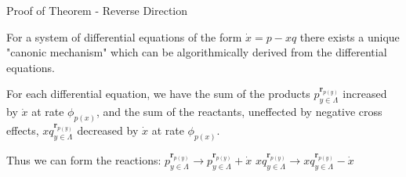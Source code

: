\begin{frame}{Proof of Theorem - Reverse Direction}
    
	For a system of differential equations of the form \(\dot x = p - xq\) there exists a unique "canonic mechanism" which can be algorithmically derived from the differential equations.\newline
        
  	For each differential equation, we have the sum of the products \(p_{y \in \Lambda}^{\textbf{r}_{p(y)}}\) increased by \(\dot x\) at rate \(\phi_{p(x)}\), and the sum of the reactants, uneffected by negative cross effects, \(xq_{y \in \Lambda}^{\textbf{r}_{p(y)}}\) decreased by \(\dot x\) at rate \(\phi_{p(x)}\).\newline
        
        Thus we can form the reactions:\newline \newline
        \(p_{y \in \Lambda}^{\textbf{r}_{p(y)}} \to p_{y \in \Lambda}^{\textbf{r}_{p(y)}} + \dot x\) \newline \newline
        \(xq_{y \in \Lambda}^{\textbf{r}_{p(y)}} \to xq_{y \in \Lambda}^{\textbf{r}_{p(y)}} - \dot x\)
   
\end{frame}
